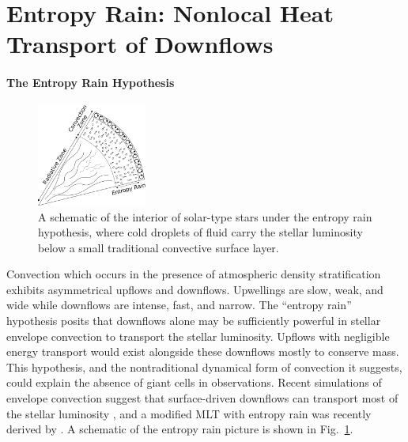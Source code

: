 \documentclass[preprint, hmargin=1in, vmargin=1in]{aastex62}
\begin{document}
\section*{\textbf{Entropy Rain: Nonlocal Heat Transport of Downflows}}
\paragraph{The Entropy Rain Hypothesis}
\begin{figure}
	\begin{center}
	\vspace{-28pt}
    \includegraphics[width=0.32\textwidth]{./figs/entropy_rain_schematic.png}
	\vspace{-16pt}
	\end{center}
    \caption{
	A schematic of the interior of solar-type stars under the entropy rain hypothesis, where cold droplets of fluid carry the stellar luminosity below a small traditional convective surface layer.
	\label{fig:entropy_rain} }
	\vspace{-16pt}
\end{figure}

Convection which occurs in the presence of atmospheric density stratification exhibits asymmetrical upflows and downflows.
Upwellings are slow, weak, and wide while downflows are intense, fast, and narrow.
The ``entropy rain'' hypothesis \citep[][]{spruit1997} posits that downflows alone may be sufficiently powerful in stellar envelope convection to transport the stellar luminosity.
Upflows with negligible energy transport would exist alongside these downflows mostly to conserve mass.
This hypothesis, and the nontraditional dynamical form of convection it suggests, could explain the absence of giant cells in observations.
Recent simulations of envelope convection suggest that surface-driven downflows can transport most of the stellar luminosity \citep{kapyla&all2017}, and a modified MLT with entropy rain was recently derived by \citet{brandenburg2016}.
A schematic of the entropy rain picture is shown in Fig.~\ref{fig:entropy_rain}.
\end{document}
